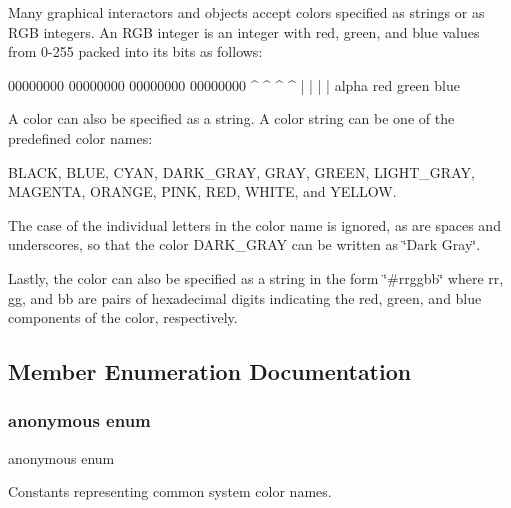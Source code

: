Many graphical interactors and objects accept colors specified as strings or as R\+GB integers. An R\+GB integer is an integer with red, green, and blue values from 0-\/255 packed into its bits as follows\+:


\begin{DoxyPre}
00000000 00000000 00000000 00000000
   ^        ^        ^        ^
   |        |        |        |
 alpha     red     green     blue
\end{DoxyPre}


A color can also be specified as a string. A color string can be one of the predefined color names\+:

{\ttfamily B\+L\+A\+CK}, {\ttfamily B\+L\+UE}, {\ttfamily C\+Y\+AN}, {\ttfamily D\+A\+R\+K\+\_\+\+G\+R\+AY}, {\ttfamily G\+R\+AY}, {\ttfamily G\+R\+E\+EN}, {\ttfamily L\+I\+G\+H\+T\+\_\+\+G\+R\+AY}, {\ttfamily M\+A\+G\+E\+N\+TA}, {\ttfamily O\+R\+A\+N\+GE}, {\ttfamily P\+I\+NK}, {\ttfamily R\+ED}, {\ttfamily W\+H\+I\+TE}, and {\ttfamily Y\+E\+L\+L\+OW}.

The case of the individual letters in the color name is ignored, as are spaces and underscores, so that the color {\ttfamily D\+A\+R\+K\+\_\+\+G\+R\+AY} can be written as {\ttfamily \char`\"{}\+Dark Gray\char`\"{}}.

Lastly, the color can also be specified as a string in the form {\ttfamily \char`\"{}\#rrggbb\char`\"{}} where {\ttfamily rr}, {\ttfamily gg}, and {\ttfamily bb} are pairs of hexadecimal digits indicating the red, green, and blue components of the color, respectively. 

\subsection{Member Enumeration Documentation}
\mbox{\label{classGColor_a06fc87d81c62e9abb8790b6e5713c55b}} 
\subsubsection{\texorpdfstring{anonymous enum}{anonymous enum}}
{\footnotesize\ttfamily anonymous enum}



Constants representing common system color names. 

